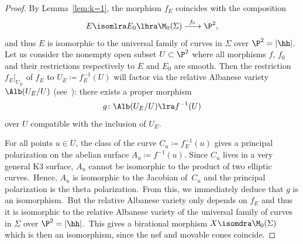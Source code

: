 \begin{proof}
By Lemma~\ref{lem:k=1}, the morphism $f_E$ coincides with the composition
\[
E \isomlra E_0 \lhra \M_0(\Sigma) \xrightarrow{\ f_0\ } \P^2,
\]
and thus $E$ is isomorphic to the universal family of curves in $\Sigma$ over $\P^2=|\hh |$.
Let us consider the nonempty open subset $U\subset\P^2$ where all morphisms $f$, $f_0$ and their restrictions respectively to $E$ and $E_0$ are smooth.
Then the restriction $f_E \vert_{U_E}$ of $f_E$ to $U_E\coloneqq f_E^{-1}(U)$ will factor via the relative Albanese variety $\Alb (U_E/U)$ (see~\cite[Proposition 1]{fujiki}): there exists a proper morphism
\[
g\colon \Alb (U_E/U) \lra f^{-1}(U)
\]
over $U$ compatible with the inclusion of $U_E$.

For all points $u\in U$, the class of the curve $C_u\coloneqq f_E^{-1}(u)$ gives a principal polarization on the abelian surface $A_u\coloneqq f^{-1}(u)$.
Since $C_u$ lives in a very general K3 surface, $A_u$ cannot be isomorphic to the product of two elliptic curves.\
Hence, $A_u$ is isomorphic to the Jacobian of~$C_u$ and the principal polarization is the theta polarization.\
From this, we immediately deduce that $g$ is an isomorphism.\
But the relative Albanese variety only depends on $f_E$ and thus it is isomorphic to the relative Albanese variety of the universal family of curves in $\Sigma$ over $\P^2=|\hh |$.\
This gives a birational morphism $X \isomdra  \M_0(\Sigma)$ which is then an isomorphism, since the nef and movable cones coincide.
\end{proof}


